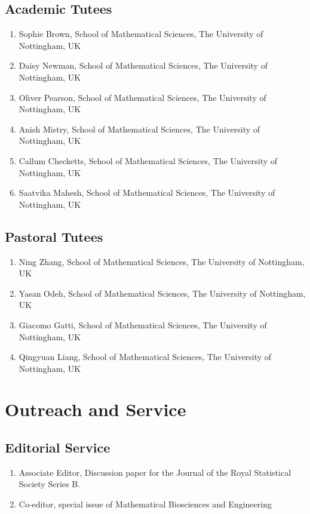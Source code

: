 \documentclass[11pt,a4paper,sans]{moderncv}        %
\begin{document}
\subsection{Academic Tutees}
\begin{enumerate}
	\item Sophie Brown, School of Mathematical Sciences, The University of Nottingham, UK
	\item Daisy Newman, School of Mathematical Sciences, The University of Nottingham, UK
	\item Oliver Pearson, School of Mathematical Sciences, The University of Nottingham, UK
	\item Anish Mistry, School of Mathematical Sciences, The University of Nottingham, UK
	\item Callum Checketts, School of Mathematical Sciences, The University of Nottingham, UK
	\item Saatvika Mahesh, School of Mathematical Sciences, The University of Nottingham, UK
\end{enumerate}

\subsection{Pastoral Tutees}
\begin{enumerate}
	\item Ning Zhang, School of Mathematical Sciences, The University of Nottingham, UK
	\item Yasan Odeh, School of Mathematical Sciences, The University of Nottingham, UK
	\item Giacomo Gatti, School of Mathematical Sciences, The University of Nottingham, UK
	\item Qingyuan Liang, School of Mathematical Sciences, The University of Nottingham, UK
\end{enumerate}


\section{Outreach and Service}
\subsection{Editorial Service}
\begin{enumerate}
	\item Associate Editor, Discussion paper for the Journal of the Royal Statistical Society Series B. 
	\item Co-editor, special issue of Mathematical Biosciences and Engineering 
\end{enumerate}
\end{document}
